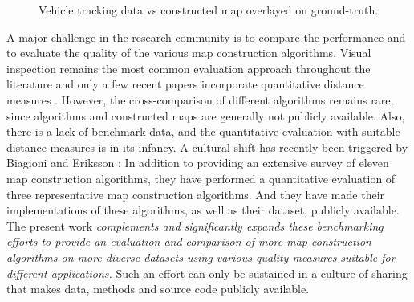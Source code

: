 \documentclass[natbib]{svjour3}                    \smartqed  \usepackage[table]{xcolor}
\begin{document}
\begin{figure}[htbp]
\begin{center}
\hspace{5pt}
\end{center}
\vspace{-10pt}
\caption{Vehicle tracking data vs constructed map overlayed on ground-truth.}
\label{fig:example}
\end{figure}

A major challenge in the research community is to compare the performance and to evaluate the quality of the various map construction algorithms. 
Visual inspection remains the most common evaluation approach throughout the literature and only a few recent papers incorporate quantitative distance measures \cite{aw-SIGSPATIAL-13, be-irmgp-12, Biagioni:2012:MIF:2424321.2424333, Karagiorgou:2012:VTD:2424321.2424334, Liu:2012:MLS:2339530.2339637}. However, the cross-comparison of different algorithms remains rare, since algorithms and constructed maps are generally not publicly available. Also, there is a lack of benchmark data, and the quantitative evaluation with suitable distance measures is in its infancy.
A cultural shift has recently been triggered by Biagioni and Eriksson \cite{be-irmgp-12}: In addition to providing an extensive survey of eleven map construction algorithms, they have performed a quantitative evaluation of three representative map construction algorithms. And they have made their implementations of these algorithms, as well as their dataset, publicly available.
The present work {\em complements and significantly expands these benchmarking efforts to provide an evaluation and comparison of more map construction algorithms on more diverse datasets using various quality measures suitable for different applications.}
Such an effort can only be sustained in a culture of sharing that makes data, methods and source code publicly available.
\end{document}
